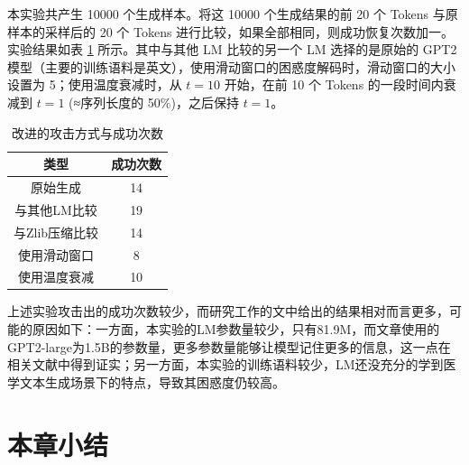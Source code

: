 
本实验共产生 10000 个生成样本。将这 10000 个生成结果的前 20 个 Tokens 与原样本的采样后的 20 个 Tokens 进行比较，如果全部相同，则成功恢复次数加一。实验结果如表 \ref{Attack_Method_with_Num_Success} 所示。其中与其他 LM 比较的另一个 LM 选择的是原始的 GPT2 模型\cite{GPT2}（主要的训练语料是英文），使用滑动窗口的困惑度解码时，滑动窗口的大小设置为 5；使用温度衰减时，从 $t=10$ 开始，在前 10 个 Tokens 的一段时间内衰减到 $t=1$ (≈序列长度的 50\%)，之后保持 $t=1$。

\begin{table}[]
	\centering
	\caption{改进的攻击方式与成功次数}
	\begin{tabular}{|c|c|}
		\hline
		类型&成功次数   \\ \hline
		原始生成& 14    \\ \hline
		与其他LM比较&19   \\ \hline
		与Zlib压缩比较&14    \\ \hline
		使用滑动窗口&8    \\ \hline
		使用温度衰减&10    \\ \hline
	\end{tabular}
	\label{Attack_Method_with_Num_Success}
\end{table}

上述实验攻击出的成功次数较少，而研究工作\cite{Extrac_Train_Data_From_LM}的文中给出的结果相对而言更多，可能的原因如下：一方面，本实验的LM参数量较少，只有81.9M，而文章\cite{Extrac_Train_Data_From_LM}使用的GPT2-large为1.5B的参数量，更多参数量能够让模型记住更多的信息，这一点在相关文献中得到证实\cite{makingPTLM_few_shot, EmergentLLM, systematicLLM, GPT2, GPT3, BERT}；另一方面，本实验的训练语料较少，LM还没充分的学到医学文本生成场景下的特点，导致其困惑度仍较高。

\section{本章小结}


